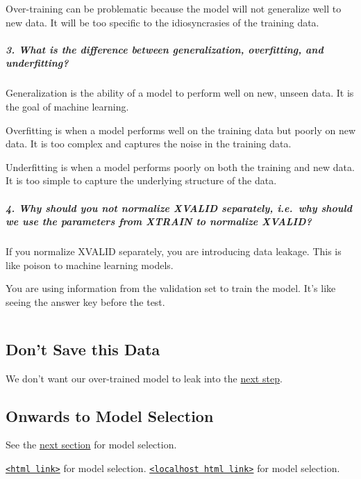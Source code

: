 \documentclass[11pt]{article}
\makeatletter
\newcommand{\boxspacing}{\kern\kvtcb@left@rule\kern\kvtcb@boxsep}
\newcommand{\prompt}[4]{
        {\ttfamily\llap{{\color{#2}[#3]:\hspace{3pt}#4}}\vspace{-\baselineskip}}
    }
\makeatother
\begin{document}
Over-training can be problematic because the model will not generalize
well to new data. It will be too specific to the idiosyncrasies of the
training data.

\subparagraph{3. What is the difference between generalization,
overfitting, and
underfitting?}\label{what-is-the-difference-between-generalization-overfitting-and-underfitting}

Generalization is the ability of a model to perform well on new, unseen
data. It is the goal of machine learning.

Overfitting is when a model performs well on the training data but
poorly on new data. It is too complex and captures the noise in the
training data.

Underfitting is when a model performs poorly on both the training and
new data. It is too simple to capture the underlying structure of the
data.

\subparagraph{4. Why should you not normalize XVALID separately,
i.e.~why should we use the parameters from XTRAIN to normalize
XVALID?}\label{why-should-you-not-normalize-xvalid-separately-i.e.-why-should-we-use-the-parameters-from-xtrain-to-normalize-xvalid}

If you normalize XVALID separately, you are introducing data leakage.
This is like poison to machine learning models.

You are using information from the validation set to train the model.
It's like seeing the answer key before the test.

    \begin{tcolorbox}[breakable, size=fbox, boxrule=1pt, pad at break*=1mm,colback=cellbackground, colframe=cellborder]
\prompt{In}{incolor}{110}{\boxspacing}
\begin{Verbatim}[commandchars=\\\{\}]

\end{Verbatim}
\end{tcolorbox}

    \subsection{Don't Save this Data}\label{dont-save-this-data}

We don't want our over-trained model to leak into the
\href{../1-models/models.ipynb}{next step}.

    \subsection{Onwards to Model
Selection}\label{onwards-to-model-selection}

See the \href{../1-models/models.ipynb}{next section} for model
selection.

\href{https://nbviewer.org/github/ahester57/ai_workshop/blob/master/notebooks/time_for_crab/1-models/models.ipynb}{\texttt{\textless{}html\ link\textgreater{}}}
for model selection.
\href{../1-models/models.html}{\texttt{\textless{}localhost\ html\ link\textgreater{}}}
for model selection.


    
    
    
\end{document}
